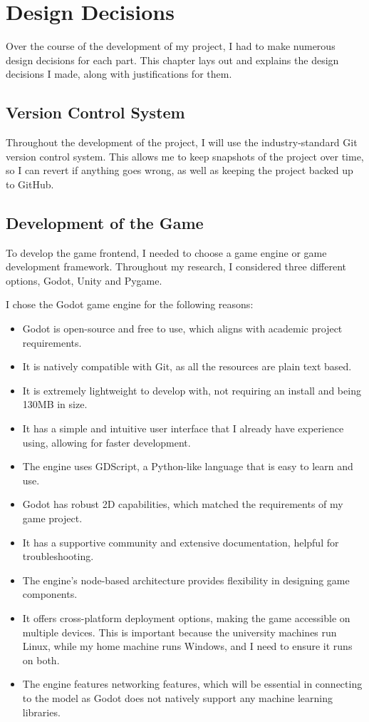 \chapter{Design Decisions}

Over the course of the development of my project, I had to make numerous design decisions for each part. 
This chapter lays out and explains the design decisions I made, along with justifications for them.

\section{Version Control System}

Throughout the development of the project, I will use the industry-standard Git version control system. 
This allows me to keep snapshots of the project over time, so I can revert if anything goes wrong, as well as keeping the project backed up to GitHub.

\section{Development of the Game}

To develop the game frontend, I needed to choose a game engine or game development framework. Throughout my research, I considered three different options, Godot, Unity and Pygame.

I chose the Godot game engine for the following reasons:
\begin{itemize}
    \item Godot is open-source and free to use, which aligns with academic project requirements.
    \item It is natively compatible with Git, as all the resources are plain text based.
    \item It is extremely lightweight to develop with, not requiring an install and being 130MB in size.
    \item It has a simple and intuitive user interface that I already have experience using, allowing for faster development.
    \item The engine uses GDScript, a Python-like language that is easy to learn and use.
    \item Godot has robust 2D capabilities, which matched the requirements of my game project.
    \item It has a supportive community and extensive documentation, helpful for troubleshooting.
    \item The engine's node-based architecture provides flexibility in designing game components.
    \item It offers cross-platform deployment options, making the game accessible on multiple devices. This is important because the university machines run Linux, while my home machine runs Windows, and I need to ensure it runs on both.
    \item The engine features networking features, which will be essential in connecting to the model as Godot does not natively support any machine learning libraries.
\end{itemize}

